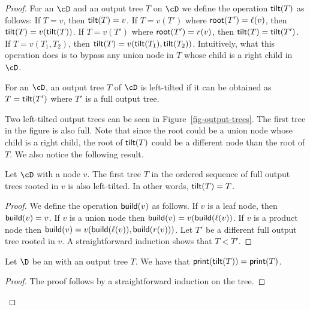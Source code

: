 \begin{proof}
	For an \dsabbr $\cD$ and an output tree $T$ on $\cD$ we define the operation ${\sf tilt}(T)$ as follows: If $T = v$, then ${\sf tilt}(T) = v$. If $T = v(T')$ where ${\sf root}(T') = \ell(v)$, then ${\sf tilt}(T) = v({\sf tilt}(T))$. If $T = v(T')$ where ${\sf root}(T') = r(v)$, then ${\sf tilt}(T) = {\sf tilt}(T')$. If $T = v(T_1,T_2)$, then ${\sf tilt}(T) = v({\sf tilt}(T_1),{\sf tilt}(T_2))$. Intuitively, what this operation does is to bypass any union node in $T$ whose child is a right child in $\cD$.
	
	\begin{definition}
		For an \dsabbr $\cD$, an output tree $T$ of $\cD$ is left-tilted if it can be obtained as $T = {\sf tilt}(T')$ where $T'$ is a full output tree.
	\end{definition}
	
	Two left-tilted output trees can be seen in Figure~\ref{fig-output-trees}. The first tree in the figure is also full. Note that since the root could be a union node whose child is a right child, the root of ${\sf tilt}(T)$ could be a different node than the root of $T$. We also notice the following result.
	
	\begin{lemma}\label{appendix:enum-first}
		Let $\cD$ \dsabbr with a node $v$. The first tree $T$ in the ordered sequence of full output trees rooted in $v$ is also left-tilted. In other words, ${\sf tilt}(T) = T$.
	\end{lemma}
	\begin{proof}
		We define the operation ${\sf build}(v)$ as follows. If $v$ is a leaf node, then ${\sf build}(v) = v$. If $v$ is a union node then ${\sf build}(v) = v({\sf build}(\ell(v))$. If $v$ is a product node then ${\sf build}(v) = v({\sf build}(\ell(v)),{\sf build}(r(v)))$. Let $T'$ be a different full output tree rooted in $v$. A straightforward induction shows that $T < T'$.
	\end{proof}
	
	\begin{lemma}
		Let $\D$ be an \dsabbr with an output tree $T$. We have that ${\sf print}({\sf tilt}(T)) = {\sf print}(T)$.
	\end{lemma}
	\begin{proof}
		The proof follows by a straightforward induction on the tree. 
	\end{proof}
	
	
	

\end{proof}
